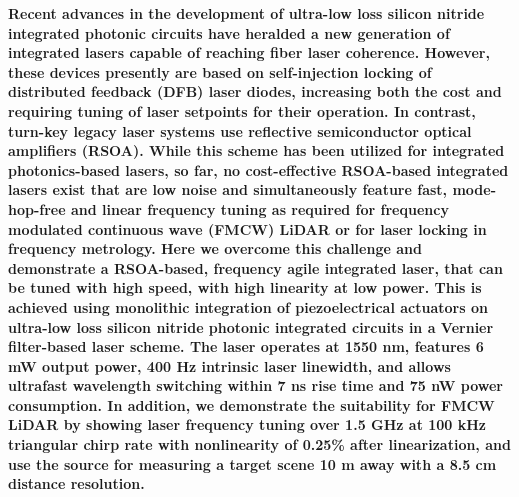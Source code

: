 \documentclass[9pt,twocolumn,twoside, superscriptaddress]{revtex4-2}
\begin{document}
\author{Andrey Voloshin}

\author{Sunil Bhave}

\author{Tobias J. Kippenberg}

\maketitle
	
\noindent \textbf{Recent advances in the development of ultra-low loss silicon nitride integrated photonic circuits have heralded a new generation of integrated lasers capable of reaching fiber laser coherence.  
However, these devices presently are based on self-injection locking of distributed feedback (DFB) laser diodes, increasing both the cost and requiring tuning of laser setpoints for their operation. 
In contrast, turn-key legacy laser systems use reflective semiconductor optical amplifiers (RSOA). While this scheme has been utilized for integrated photonics-based lasers, so far, no cost-effective RSOA-based integrated lasers exist that are low noise and simultaneously feature fast, mode-hop-free and linear frequency tuning as required for frequency modulated continuous wave (FMCW) LiDAR or for laser locking in frequency metrology.
Here we overcome this challenge and demonstrate a RSOA-based, frequency agile integrated laser, that can be tuned with high speed, with high linearity at low power.
This is achieved using monolithic integration of piezoelectrical actuators on ultra-low loss silicon nitride photonic integrated circuits in a Vernier filter-based laser scheme.
The laser operates at 1550 nm, features 6 mW output power, 400 Hz intrinsic laser linewidth, and allows ultrafast wavelength switching within 7 ns rise time and 75 nW power consumption.
In addition, we demonstrate the suitability for FMCW LiDAR by showing laser frequency tuning over 1.5 GHz at 100 kHz triangular chirp rate with nonlinearity of 0.25\% after linearization, and use the source for measuring a target scene 10 m away with a 8.5 cm distance resolution. }
\end{document}
